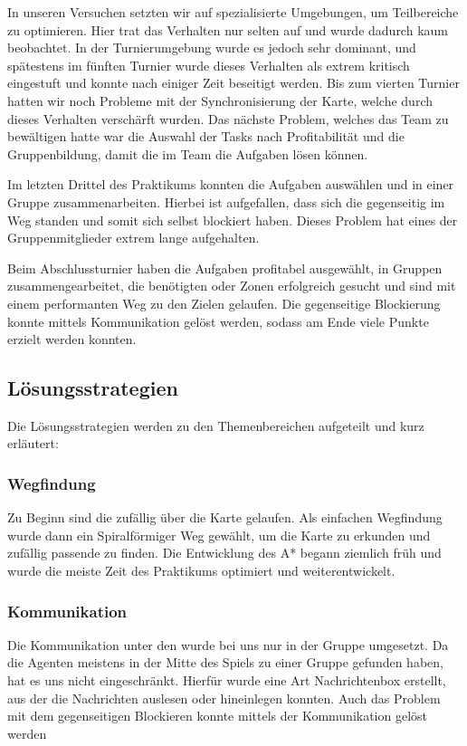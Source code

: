 In unseren Versuchen setzten wir auf spezialisierte Umgebungen, um Teilbereiche zu optimieren. Hier trat das Verhalten nur selten auf und wurde dadurch kaum beobachtet. In der Turnierumgebung wurde es jedoch sehr dominant, und spätestens im fünften Turnier wurde dieses Verhalten als extrem kritisch eingestuft und konnte nach einiger Zeit beseitigt werden. Bis zum vierten Turnier hatten wir noch Probleme mit der Synchronisierung der Karte, welche durch dieses Verhalten verschärft wurden.
Das nächste Problem, welches das Team zu bewältigen hatte war die Auswahl der Tasks nach Profitabilität und die Gruppenbildung, damit die \Agents im Team die Aufgaben lösen können. 

Im letzten Drittel des Praktikums konnten die \Agents Aufgaben auswählen und in einer Gruppe zusammenarbeiten. Hierbei ist aufgefallen, dass sich die \Agents gegenseitig im Weg standen und somit sich selbst blockiert haben. Dieses Problem hat eines der Gruppenmitglieder extrem lange aufgehalten. \newline

Beim Abschlussturnier haben die \Agents Aufgaben profitabel ausgewählt, in Gruppen zusammengearbeitet, die benötigten \Dispenser oder Zonen erfolgreich gesucht und sind mit einem performanten Weg zu den Zielen gelaufen. Die gegenseitige Blockierung konnte mittels Kommunikation gelöst werden, sodass am Ende viele Punkte erzielt werden konnten. \newline

\subsection{Lösungsstrategien}
Die Lösungsstrategien werden zu den Themenbereichen aufgeteilt und kurz erläutert:

\subsubsection{Wegfindung}
Zu Beginn sind die \Agents zufällig über die Karte gelaufen. Als einfachen Wegfindung wurde dann ein Spiralförmiger Weg gewählt, um die Karte zu erkunden und zufällig passende \Dispenser zu finden. Die Entwicklung des A* begann ziemlich früh und wurde die meiste Zeit des Praktikums optimiert und weiterentwickelt. 

\subsubsection{Kommunikation}
Die Kommunikation unter den \Agents wurde bei uns nur in der Gruppe umgesetzt. Da die Agenten meistens in der Mitte des Spiels zu einer Gruppe gefunden haben, hat es uns nicht eingeschränkt. Hierfür wurde eine Art Nachrichtenbox erstellt, aus der die \Agents Nachrichten auslesen oder hineinlegen konnten. Auch das Problem mit dem gegenseitigen Blockieren konnte mittels der Kommunikation gelöst werden

